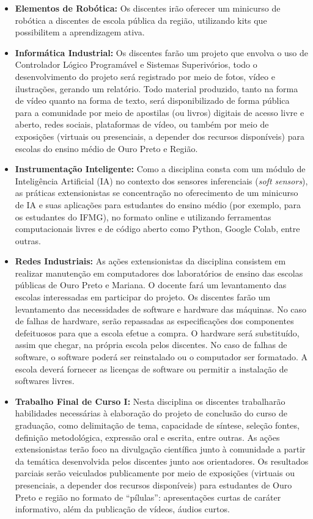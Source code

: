 \documentclass[
	12pt,				%
	openright,			%
	oneside,			%
	a4paper,			%
	english,			%
	brazil				%
	]{abntex2}
\begin{document}
\begin{itemize}
    \item \textbf{Elementos de Robótica:} Os discentes irão oferecer um minicurso de robótica a discentes de escola pública da região, utilizando kits que possibilitem a aprendizagem ativa.

    \item \textbf{Informática Industrial:} Os discentes farão um projeto que envolva o uso de Controlador Lógico Programável e Sistemas Superivórios, todo o desenvolvimento do projeto será registrado por meio de fotos, vídeo e ilustrações, gerando um relatório. Todo material produzido, tanto na forma de vídeo quanto na forma de texto, será disponibilizado de forma pública para a comunidade por meio de apostilas (ou livros) digitais de acesso livre e aberto, redes sociais, plataformas de vídeo, ou também por meio de exposições (virtuais ou presenciais, a depender dos recursos disponíveis) para escolas do ensino médio de Ouro Preto e Região.

    \item \textbf{Instrumentação Inteligente:} Como a disciplina consta com um módulo de Inteligência Artificial (IA) no contexto dos sensores inferenciais (\textit{soft sensors}), as práticas extensionistas se concentração no oferecimento de um minicurso de IA e suas aplicações para estudantes do ensino médio (por exemplo, para os estudantes do IFMG), no formato online e utilizando ferramentas computacionais livres e de código aberto como Python, Google Colab, entre outras.

    \item \textbf{Redes Industriais:} As ações extensionistas da disciplina consistem em realizar manutenção em computadores dos laboratórios de ensino das escolas públicas de Ouro Preto e Mariana. O docente fará um levantamento das escolas interessadas em participar do projeto. Os discentes farão um levantamento das necessidades de software e hardware das máquinas. No caso de falhas de hardware, serão repassadas as especificações dos componentes defeituosos para que a escola efetue a compra. O hardware será substituído, assim que chegar, na própria escola pelos discentes. No caso de falhas de software, o software poderá ser reinstalado ou o computador ser formatado. A escola deverá fornecer as licenças de software ou permitir a instalação de softwares livres.

     \item \textbf{Trabalho Final de Curso I:} Nesta disciplina os discentes trabalharão habilidades necessárias à elaboração do projeto de conclusão do curso de graduação, como delimitação de tema, capacidade de síntese, seleção fontes, definição metodológica, expressão oral e escrita, entre outras. As ações extensionistas terão foco na divulgação científica junto à comunidade a partir da temática desenvolvida pelos discentes junto aos orientadores. Os resultados parciais serão veiculados publicamente por meio de exposições (virtuais ou presenciais, a depender dos recursos disponíveis) para estudantes de Ouro Preto e região no formato de ``pílulas'': apresentações curtas de caráter informativo, além da publicação de vídeos, áudios  curtos.


\end{itemize}
\end{document}
